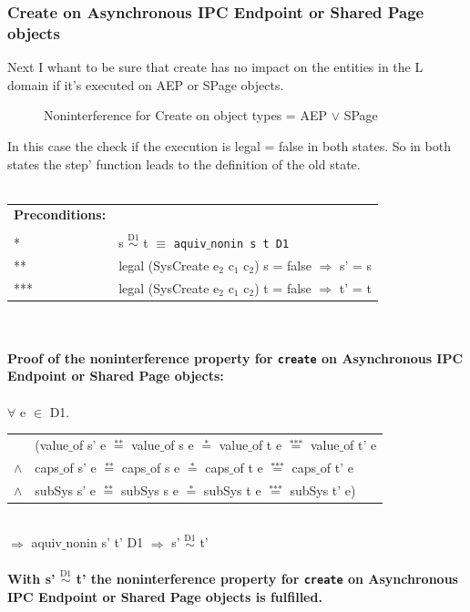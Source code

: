 \documentclass[11pt,a4paper,twoside]{article}
\begin{document}
{\subsubsection{Create on Asynchronous IPC Endpoint or Shared Page objects}
Next I whant to be sure that create has no impact on the entities in the L domain if it's executed on AEP or SPage objects.\\
\begin{flushleft}
\begin{figure}[H]
\caption{Noninterference for Create on object types = AEP $\vee$ SPage}
\end{figure}
\end{flushleft} 
In this case the check if the execution is legal = false in both states. So in both states the step' function leads to the definition of the old state. \\ \\
\begin{tabular}{ll}
\textbf{Preconditions:} \\ \\
* & s $\overset{\text{D1}}{\sim}$ t $\equiv$ \texttt{aquiv$\_$nonin s t D1}	\\ 
** & legal (SysCreate e$_2$ c$_1$ c$_2$) s = false $\Rightarrow$ s' = s \\ 
*** & legal (SysCreate e$_2$ c$_1$ c$_2$) t = false $\Rightarrow$ t' = t
\end{tabular}\\ \\ 
\textbf{Proof of the noninterference property for \texttt{create} on Asynchronous IPC Endpoint or Shared Page objects:}\\ \\
$\forall$ e $\in$ D1. \\ 
\begin{tabular}{ll}
& (value$\_$of s' e $\overset{\text{**}}{=}$ value$\_$of s e $\overset{\text{*}}{=}$ value$\_$of t e $\overset{\text{***}}{=}$ value$\_$of t' e \\
$\wedge$ & caps$\_$of s' e $\overset{\text{**}}{=}$ caps$\_$of s e $\overset{\text{*}}{=}$ caps$\_$of t e $\overset{\text{***}}{=}$ caps$\_$of t' e \\
$\wedge$ & subSys s' e $\overset{\text{**}}{=}$ subSys s e $\overset{\text{*}}{=}$ subSys t e $\overset{\text{***}}{=}$ subSys t' e)
\end{tabular} \\
$\Rightarrow$ aquiv$\_$nonin s' t' D1 $\Rightarrow$ s' $\overset{\text{D1}}{\sim}$ t' \\ \\
\textbf{With s' $\overset{\text{D1}}{\sim}$ t' the noninterference property for \texttt{create} on Asynchronous IPC Endpoint or Shared Page objects is fulfilled.} 
}
\end{document}
